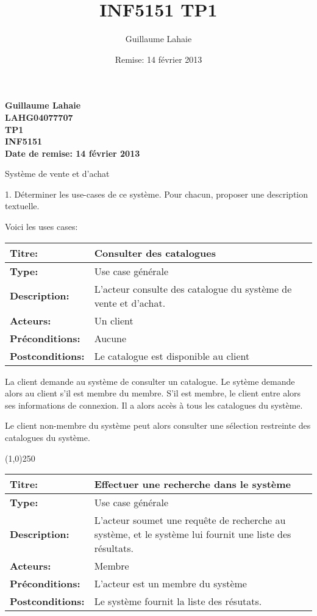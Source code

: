 \documentclass[letterpaper,11pt]{letter}
\title{INF5151 TP1}
\author{Guillaume Lahaie}
\date{Remise: 14 février 2013}
\begin{document}
\begin{center}{\Large{\bf Guillaume Lahaie\\
LAHG04077707\\
TP1\\
INF5151\\
Date de remise: 14 février 2013}}\\
\end{center}

Système de vente et d'achat

{\Large 1. Déterminer les use-cases de ce système. Pour chacun, proposer une description textuelle.}

Voici les uses cases:



\begin{tabular}{|l|p{}|}
  \hline
{\bf Titre:} & Consulter des catalogues\\
  \hline
{\bf Type:} & Use case générale\\
\hline
{\bf Description:} & L'acteur consulte des catalogue du système de vente et d'achat.\\
\hline
{\bf Acteurs:} & Un client\\
\hline
{\bf Préconditions:} & Aucune\\
\hline
{\bf Postconditions:} & Le catalogue est disponible au client\\
\hline
\end{tabular}

La client demande au système de consulter un catalogue. Le sytème demande alors au client s'il est membre du membre. S'il est membre, le client entre 
alors ses informations de connexion. Il a alors accès à tous les catalogues du système.

Le client non-membre du système peut alors consulter une sélection restreinte des catalogues du système.

\begin{center}
\line(1,0){250}
\end{center}

\begin{tabular}{|l|p{}|}
  \hline
{\bf Titre:} & Effectuer une recherche dans le système\\
  \hline
{\bf Type:} & Use case générale\\
\hline
{\bf Description:} & L'acteur soumet une requête de recherche au système, et le système lui fournit une liste des résultats.\\
\hline
{\bf Acteurs:} & Membre\\
\hline
{\bf Préconditions:} & L'acteur est un membre du système\\
\hline
{\bf Postconditions:} & Le système fournit la liste des résutats.\\
\hline
\end{tabular}
\end{document}
